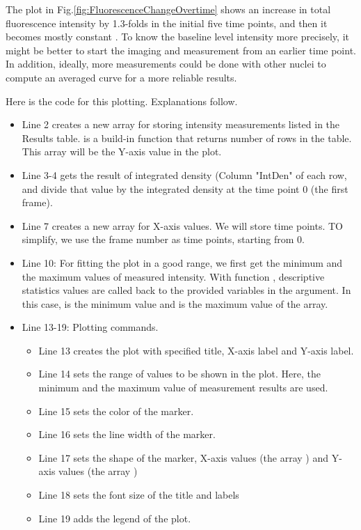 The plot in Fig.\ref{fig:FluorescenceChangeOvertime} shows an increase in total fluorescence intensity by 1.3-folds in the initial five time points, and then it becomes mostly constant . To know the baseline level intensity more precisely, it might be better to start the imaging and measurement from an earlier time point. In addition, ideally, more measurements could be done with other nuclei to compute an averaged curve for a more reliable results. 

Here is the code for this plotting. Explanations follow. 

 
 
 \begin{itemize}
     \item Line 2 creates a new array for storing intensity measurements listed in the Results table.  is a build-in function that returns number of rows in the table. This array will be the Y-axis value in the plot. 
     \item Line 3-4 gets the result of integrated density (Column "IntDen" of each row, and divide that value by the integrated density at the time point 0 (the first frame). 
     \item Line 7 creates a new array for X-axis values. We will store time points. TO simplify, we use the frame number as time points, starting from 0. 
     \item Line 10: For fitting the plot in a good range, we first get the minimum and the maximum values of measured intensity. With function , descriptive statistics values are called back to the provided variables in the argument. In this case,  is the minimum value and  is the maximum value of the array. 
     \item Line 13-19: Plotting commands.
     \begin{itemize}
         \item Line 13 creates the plot with specified title, X-axis label and Y-axis label. 
         \item Line 14 sets the range of values to be shown in the plot. Here, the minimum and the maximum value of measurement results are used.
         \item Line 15 sets the color of the marker.
         \item Line 16 sets the line width of the marker.
         \item Line 17 sets the shape of the marker, X-axis values (the array ) and Y-axis values (the array )
         \item Line 18 sets the font size of the title and labels
         \item Line 19 adds the legend of the plot.  
     \end{itemize}
 \end{itemize}


